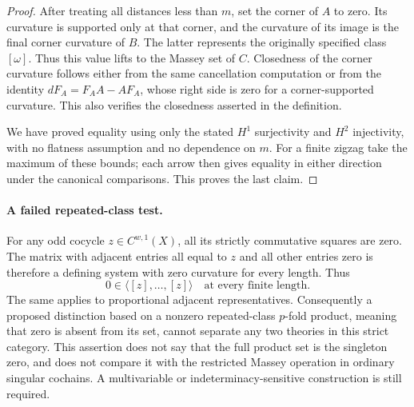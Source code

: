 \begin{proof}
After treating all distances less than $m$, set the
corner of $A$ to zero. Its curvature is supported
only at that corner, and the curvature of its image
is the final corner curvature of $B$. The latter
represents the originally specified class $[\omega]$.
Thus this value lifts to the Massey set of $C$.
Closedness of the corner curvature follows either
from the same cancellation computation or from the
identity $dF_A=F_AA-AF_A$, whose right side is zero
for a corner-supported curvature. This also verifies
the closedness asserted in the definition.

We have proved equality using only the stated $H^1$
surjectivity and $H^2$ injectivity, with no flatness
assumption and no dependence on $m$. For a finite
zigzag take the maximum of these bounds; each arrow
then gives equality in either direction under the
canonical comparisons. This proves the last claim.
\end{proof}

\paragraph{A failed repeated-class test.}
For any odd cocycle $z\in C^{w,1}(X)$, all its strictly
commutative squares are zero. The matrix with adjacent
entries all equal to $z$ and all other entries zero
is therefore a defining system with zero curvature
for every length. Thus
\[
           0\in\langle[z],\ldots,[z]\rangle
                       \quad\text{at every finite length}.
\]
The same applies to proportional adjacent representatives.
Consequently a proposed distinction based on a nonzero
repeated-class $p$-fold product, meaning that zero is
absent from its set, cannot separate any two theories
in this strict category. This assertion does not say
that the full product set is the singleton zero, and
does not compare it with the restricted Massey operation
in ordinary singular cochains. A multivariable or
indeterminacy-sensitive construction is still required.
